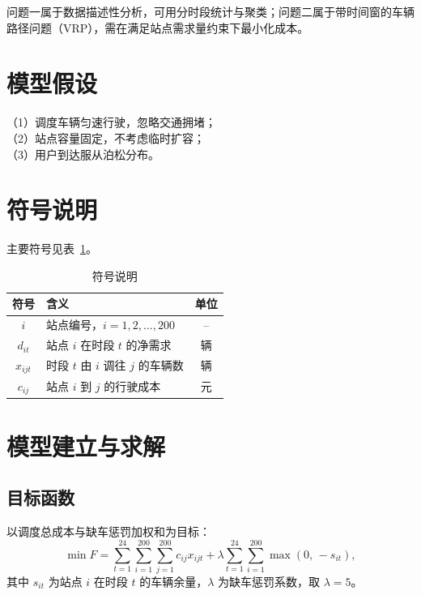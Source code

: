 \documentclass[UTF8,a4paper,zihao=-4,fontset=\swfontset]{ctexart}
\begin{document}
问题一属于数据描述性分析，可用分时段统计与聚类；问题二属于带时间窗的车辆路径问题（VRP），需在满足站点需求量约束下最小化成本。

\section{模型假设}

（1）调度车辆匀速行驶，忽略交通拥堵；\\
（2）站点容量固定，不考虑临时扩容；\\
（3）用户到达服从泊松分布。

\section{符号说明}

主要符号见表~\ref{tab:symbol}。

\begin{table}[htbp]
  \centering
  \caption{符号说明}
  \label{tab:symbol}
  \begin{tabular}{clc}
    \toprule
    符号 & 含义 & 单位 \\
    \midrule
    $i$        & 站点编号，$i=1,2,\dots,200$ & -- \\
    $d_{it}$   & 站点 $i$ 在时段 $t$ 的净需求 & 辆 \\
    $x_{ijt}$  & 时段 $t$ 由 $i$ 调往 $j$ 的车辆数 & 辆 \\
    $c_{ij}$   & 站点 $i$ 到 $j$ 的行驶成本 & 元 \\
    \bottomrule
  \end{tabular}
\end{table}

\section{模型建立与求解}

\subsection{目标函数}

以调度总成本与缺车惩罚加权和为目标：
\begin{equation}
  \min F=\sum_{t=1}^{24}\sum_{i=1}^{200}\sum_{j=1}^{200} c_{ij}x_{ijt}
  +\lambda\sum_{t=1}^{24}\sum_{i=1}^{200}\max\left(0,\,-s_{it}\right),
  \label{eq:obj}
\end{equation}
其中 $s_{it}$ 为站点 $i$ 在时段 $t$ 的车辆余量，$\lambda$ 为缺车惩罚系数，取 $\lambda=5$。
\end{document}
